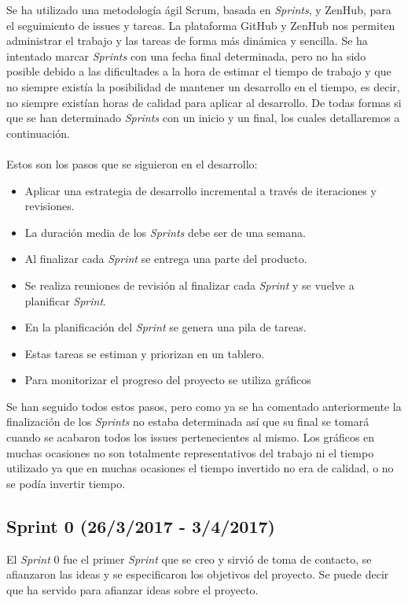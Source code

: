 Se ha utilizado una metodología ágil Scrum, basada en \emph{Sprints}, y ZenHub, para el seguimiento de issues y tareas. La plataforma GitHub y ZenHub nos permiten administrar el trabajo y las tareas de forma más dinámica y sencilla. Se ha intentado marcar \emph{Sprints} con una fecha final determinada, pero no ha sido posible debido a las dificultades a la hora de estimar el tiempo de trabajo y que no siempre existía la posibilidad de mantener un desarrollo en el tiempo, es decir, no siempre existían horas de calidad para aplicar al desarrollo.
De todas formas si que se han determinado \emph{Sprints} con un inicio y un final, los cuales detallaremos a continuación.
\\
\\
Estos son los pasos que se siguieron en el desarrollo: 

\begin{itemize}
\item
  Aplicar una estrategia de desarrollo incremental a través de
  iteraciones y revisiones.
\item
  La duración media de los \emph{Sprints} debe ser de una semana.
\item
  Al finalizar cada \emph{Sprint} se entrega una parte del producto.
\item
  Se realiza reuniones de revisión al finalizar cada \emph{Sprint} y se vuelve a planificar \emph{Sprint}.
\item
  En la planificación del \emph{Sprint} se genera una pila de tareas.
\item
  Estas tareas se estiman y priorizan en un tablero.
\item
  Para monitorizar el progreso del proyecto se utiliza gráficos
\end{itemize}

Se han seguido todos estos pasos, pero como ya se ha comentado anteriormente la finalización de los \emph{Sprints} no estaba determinada así que su final se tomará cuando se acabaron todos los issues pertenecientes al mismo. Los gráficos en muchas ocasiones no son totalmente representativos del trabajo ni el tiempo utilizado ya que en muchas ocasiones el tiempo invertido no era de calidad, o no se podía invertir tiempo.

\subsection{Sprint 0 (26/3/2017 - 3/4/2017)}\label{splrint0}
El \emph{Sprint} 0 fue el primer \emph{Sprint} que se creo y sirvió de toma de contacto, se afianzaron las ideas y se especificaron los objetivos del proyecto. Se puede decir que ha servido para afianzar ideas sobre el proyecto.


